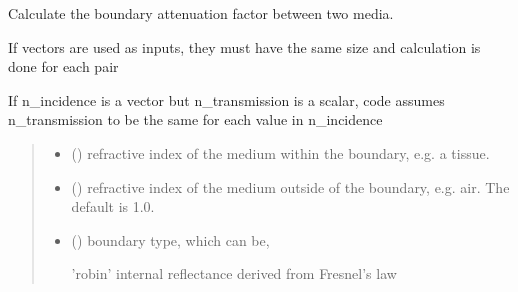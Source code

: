 \documentclass[letterpaper,10pt,english]{sphinxmanual}
\begin{document}
\begin{fulllineitems}
\label{\detokenize{_autosummary/nirfasterff.utils.boundary_attenuation:nirfasterff.utils.boundary_attenuation}}
\pysigstartsignatures
\pysiglinewithargsret
{}
{\sphinxparamcomma {}\sphinxparamcomma {}}
{}
\pysigstopsignatures
\sphinxAtStartPar
Calculate the boundary attenuation factor between two media.

\sphinxAtStartPar
If vectors are used as inputs, they must have the same size and calculation is done for each pair

\sphinxAtStartPar
If n\_incidence is a vector but n\_transmission is a scalar, code assumes n\_transmission to be the same for each value in n\_incidence
\begin{quote}\begin{description}
\begin{itemize}
\item {} 
\sphinxAtStartPar
{} () \textendash{} refractive index of the medium within the boundary, e.g. a tissue.

\item {} 
\sphinxAtStartPar
{} (\sphinxstyleliteralemphasis{\sphinxupquote{, }}) \textendash{} refractive index of the medium outside of the boundary, e.g. air. The default is 1.0.

\item {} 
\sphinxAtStartPar
{} (\sphinxstyleliteralemphasis{\sphinxupquote{, }}) \textendash{} 
\sphinxAtStartPar
boundary type, which can be,

\sphinxAtStartPar
’robin’  \sphinxhyphen{} internal reflectance derived from Fresnel’s law


\end{itemize}
\end{description}
\end{quote}
\end{fulllineitems}
\end{document}
